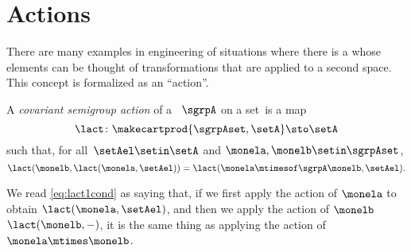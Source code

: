 
\section{Actions}
\label{sec:actions}
There are many examples in engineering of situations where there is a  whose elements can be thought of transformations that are applied to a second space.
This concept is formalized as an ``action''.

\begin{ctdefinition}
    \label{def:semigroup-cov-action-prelim}
    A \emph{covariant semigroup action} of a ~$\sgrpA$ on a set~\setA is a map
    \begin{equation}
        \label{eq:lact}
        \lact \colon \makecartprod{\sgrpAset, \setA} \sto \setA
    \end{equation}
    such that, for all~$\setAel \setin \setA$ and $\monela,\monelb\setin\sgrpAset$,
    \begin{equation}
        \label{eq:lact1cond}
        \lact(\monelb, \lact(\monela, \setAel)) = \lact(\monela \mtimesof\sgrpA \monelb, \setAel).
    \end{equation}
\end{ctdefinition}

We read \cref{eq:lact1cond} as saying that, if we first apply the action of $\monela$ to obtain $\lact(\monela, \setAel)$,
and then we apply the action of $\monelb$ $\lact(\monelb, -)$, it is the same thing as applying the action of $\monela\mtimes\monelb$.


